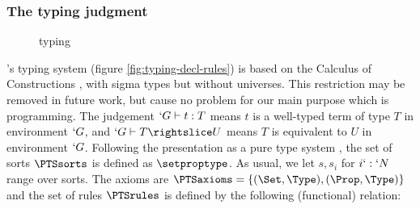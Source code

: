 \documentclass{llncs}
\begin{document}
\subsubsection{The typing judgment}
\begin{figure}[t]
  \begin{center}
    \def\infvspace{0.1in}
    \def\seq{\typed}
    \def\fCenter{\wf}
    
    \WfEmpty\DP\WfVar\DP

    \def\fCenter{\typed}
    \vspace{\infvspace}

    \Var\DP\PropSet\DP
    
    \vspace{\infvspace}
    \Subsum\DP
       
    \vspace{\infvspace}
    \Prod\DP
    
    \vspace{\infvspace}
    \Abs\DP

    \vspace{\infvspace}
    \App\DP

    \vspace{\infvspace}
    \SigmaR\DP
    
    \vspace{\infvspace}
    \SumDep\DP

    \vspace{\infvspace}
    \PiLeft\DP
    \quad
    \PiRight\DP

    \vspace{\infvspace}
    \SubsetR\DP
  \end{center}
  \vspace{-2em}
  \caption{\Russell{} typing}
  \label{fig:typing-decl-rules}
  \vspace{-1em}
\end{figure}
%
\Russell{}'s typing system (figure \vref{fig:typing-decl-rules}) is based
on the Calculus of Constructions \cite{coquandhuet88,Barras99}, with sigma types but without universes.
This restriction may be removed in future work, but cause no problem for
our main purpose which is programming. The judgement $`G \vdash t : T$
means $t$ is a well-typed term of type $T$ in environment $`G$, and $`G
\typed T \subd U$ means $T$ is equivalent to $U$ in environment $`G$. 
Following the presentation as a pure type system \cite{barendregt91}, 
the set of sorts $\PTSsorts$ is defined as $\setproptype$. As usual, we
let $s, s_i$ for $i `: `N$ range over sorts. The
axioms are $\PTSaxioms = \{ (\Set, \Type), (\Prop, \Type) \}$ and the
set of rules $\PTSrules$ is defined by the following (functional) relation:
  \axiomsd
\end{document}
